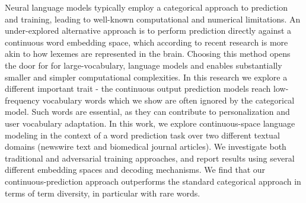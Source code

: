 Neural language models typically employ a categorical approach to prediction and training, leading to well-known computational and numerical limitations. An under-explored alternative approach is to perform prediction directly against a continuous word embedding space, which according to recent research is more akin to how lexemes are represented in the brain. Choosing this method opens the door for for large-vocabulary, language models and enables substantially smaller and simpler computational complexities. In this research we explore a different important trait - the continuous output prediction models reach low-frequency vocabulary words which we show are often ignored by the categorical model. Such words are essential, as they can contribute to personalization and user vocabulary adaptation. In this work, we explore continuous-space language modeling in the context of a word prediction task over two different textual domains (newswire text and biomedical journal articles). We investigate both traditional and adversarial training approaches, and report results using several different embedding spaces and decoding mechanisms. We find that our continuous-prediction approach outperforms the standard categorical approach in terms of term diversity, in particular with rare words.
